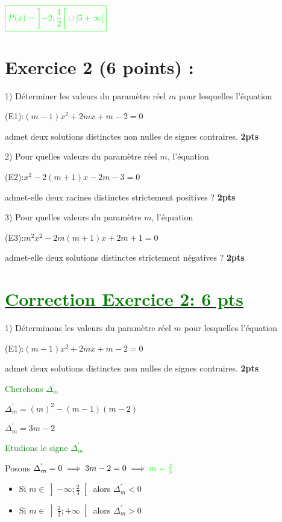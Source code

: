 \documentclass[12pt]{article}
\begin{document}
\begin{itemize}
\begin{itemize}
$\textcolor{green}{\boxed{P(x)=\left] -2; \frac{1}{2}\right[\cup\left]5 +\infty\right[  }}$

\end{itemize}
\end{itemize}

\section*{Exercice 2 (6 points) :}
1) Déterminer les valeurs du paramètre réel \( m \) pour lesquelles l'équation 

(E1):\( (m - 1)x^2 + 2mx + m - 2 = 0 \) 

admet deux solutions distinctes non nulles de signes contraires. \textbf{2pts}

2) Pour quelles valeurs du paramètre réel \( m \), l'équation

(E2):\( x^2 - 2(m + 1)x - 2m - 3 = 0 \) 
 
admet-elle deux racines distinctes strictement positives ? \textbf{2pts}

3) Pour quelles valeurs du paramètre \( m \), l'équation
 
(E3):\( m^{2}x^2 - 2m(m + 1)x + 2m + 1 = 0 \) 

admet-elle deux solutions distinctes strictement négatives ? \textbf{2pts}
\section*{\underline{\textcolor{green}{Correction Exercice 2: \textbf{6 pts}}}}
1) Déterminons les valeurs du paramètre réel \( m \) pour lesquelles l'équation 

(E1):\( (m - 1)x^2 + 2mx + m - 2 = 0 \) 

admet deux solutions distinctes non nulles de signes contraires. \textbf{2pts}

\textcolor{green}{Cherchons $\Delta_{m}^{'}$}

$\Delta_{m}^{'}=(m)^{2}-(m - 1)(m - 2)$

$\Delta_{m}^{'}=3m-2$

\textcolor{green}{Etudions le signe $\Delta_{m}^{'}$}

Posons $\Delta_{m}^{'}=0\implies 3m-2=0\implies \textcolor{green}{m=\frac{2}{3}}$

\begin{itemize}
\item Si $m\in \left]-\infty; \frac{2}{3}\right[ $ alors $\Delta_{m}^{'}<0$
\item Si $m\in \left]\frac{2}{3}; +\infty\right[ $ alors $\Delta_{m}^{'}>0$
\end{itemize}
\end{document}
